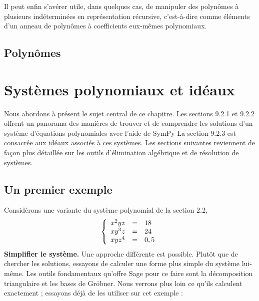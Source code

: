 Il peut enfin s’avérer utile, dans quelques cas, de manipuler des polynômes à plusieurs indéterminées en 
représentation récursive, c’est-à-dire comme éléments d’un anneau de polynômes à coefficients eux-mêmes 
polynomiaux.

\subsection{Polynômes}
\section{Systèmes polynomiaux et idéaux}
Nous abordons à présent le sujet central de ce chapitre. Les sections 9.2.1 et 9.2.2 offrent un panorama des manières de trouver et de comprendre les solutions d’un système d’équations polynomiales avec l’aide de SymPy La section 9.2.3 est consacrée aux idéaux associés à ces systèmes. Les sections suivantes reviennent
de façon plus détaillée sur les outils d’élimination algébrique et de résolution de
systèmes.
\subsection{ Un premier exemple}
Considérons une variante du système polynomial de la section 2.2,
\begin{equation}
 \left \{
   \begin{array}{r c l}
      x^{2}yz  & = & 18 \\
      xy^{3}z   & = & 24 \\
      xyz^{4} & = & 0,5
   \end{array}
   \right .
\end{equation}
\textbf{Simplifier le système.} Une approche différente est possible. Plutôt que de chercher les solutions, essayons de calculer une forme plus simple du système lui-même. Les outils fondamentaux qu’offre Sage pour ce faire sont la décomposition triangulaire et les bases de Gröbner. Nous verrons plus loin ce qu’ils calculent
exactement ; essayons déjà de les utiliser sur cet exemple :
